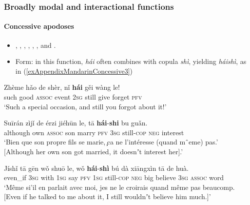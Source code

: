 \subsubsection{Broadly modal and interactional functions}
\paragraph{Concessive apodoses}
\label{appendixMandarinConcessiveConsequent}
\begin{itemize}
	\item \textcite[111]{Donazzan2008}, \textcite{Huang2007}, \textcite{JingSchmidtGries2009}, \textcite[637–638]{LiThompson1981}, \textcite{Lu2019}, \textcite{Paris1988}, \textcite{Yeh1998} and \textcite[338]{Wiedenhof2015}. 
	\item Form: in this function, \textit{hái} often combines with copula \textit{shì}, yielding \textit{háishì}, as in (\ref{exAppendixMandarinConcessive3})
\end{itemize}
\begin{exe}
	\ex
	\gll Zhème hǎo de shèr, nǐ \textbf{hái} gěi wàng le!\\
	such good \textsc{assoc} event 2\textsc{sg} still give forget \textsc{pfv}\\
	\glt \lq Such a special occasion, and still you forgot about it!\rq{ }\parencite[149]{Wiedenhof2015}

	\ex\label{exAppendixMandarinConcessive3}
	\gll Suīrán zìjǐ de érzi jiéhūn le, tā \textbf{hái}-\textbf{shi} bu guǎn.\\
	although own \textsc{assoc} son marry \textsc{pfv} 3\textsc{sg} still-\textsc{cop} \textsc{neg} interest\\
	\glt \lq Bien que son propre fils se marie, ̧ca ne l’intéresse (quand mˆeme) pas.' [Although her own son got married, it doesnʼt interest her].\rq{ }\parencite[112]{Donazzan2008}
	
	\ex\label{exAppendixMandarinConcessive4}
	\gll Jíshǐ	tā	gēn	wǒ	shuō	le,	wǒ	\textbf{hái}-\textbf{shì}	bú	dà	xiāngxìn tā	de huà.\\
	even\_if 3\textsc{sg} with 1\textsc{sg} say \textsc{pfv} 1\textsc{sg} still-\textsc{cop} \textsc{neg} big believe 3\textsc{sg} \textsc{assoc} word\\
	\glt \lq Même si'il en parlait avec moi, jes ne le croirais quand même pas beaucomp. [Even if he talked to me about it, I still wouldnʼt believe him much.]\rq{ }\parencite[275]{Paris1988}
\end{exe}

